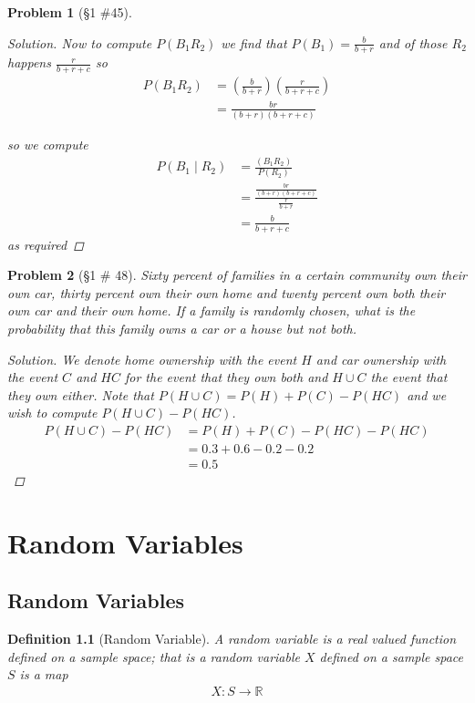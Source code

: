 \documentclass[11pt, oneside]{book}   	%
\newtheorem{definition}{Definition}[chapter]
\newtheorem{problem}{Problem}[chapter]
\begin{document}
\begin{spacing}{1.618}
\begin{problem}[\S 1 \#45]
\begin{proof}[Solution]
		Now to compute $P(B_1R_2)$ we find that $P(B_1)=\frac{b}{b+r}$ and of those $R_2$ happens $\frac{r}{b+r+c}$ so 
		\begin{alignat}{4}
			P(B_1R_2)&=\left(\frac{b}{b+r}\right)\left(\frac{r}{b+r+c}\right) \\
				&=\frac{br}{(b+r)(b+r+c)}
		\end{alignat}
		
		so we compute
		\begin{alignat}{4}
			P(B_1\mid R_2)&=\frac{(B_1R_2)}{P(R_2)} \\
				&=\frac{\frac{br}{(b+r)(b+r+c)}}{\frac{r}{b+r}} \\
				&=\frac{b}{b+r+c}
		\end{alignat}
		as required
	\end{proof}
\end{problem}

\begin{problem}[\S 1 \# 48]
	Sixty percent of families in a certain community own their own car, thirty percent own their own home and twenty percent own both their own car and their own home. If a family is randomly chosen, what is the probability that this family owns a car or a house but not both. 
	\begin{proof}[Solution]
		We denote home ownership with the event $H$ and car ownership with the event $C$ and $HC$ for the event that they own both and $H\cup C$ the event that they own either. Note that $P(H\cup C)=P(H)+P(C)-P(HC)$ and we wish to compute $P(H\cup C)-P(HC)$. 
		\begin{alignat}{4}
			P(H\cup C)-P(HC)&=P(H)+P(C)-P(HC)-P(HC) \\
				&=0.3+0.6-0.2-0.2 \\
				&=0.5
		\end{alignat}
	\end{proof}
\end{problem}

\chapter{Random Variables}

\section{Random Variables}

\begin{definition}[Random Variable]
	A \emph{random variable} is a real valued function defined on a sample space; that is a random variable $X$ defined on a sample space $S$ is a map
	\begin{alignat}{4}
		X:S\to \mathbb{R}
	\end{alignat}	
\end{definition}


\end{spacing}
\end{document}
